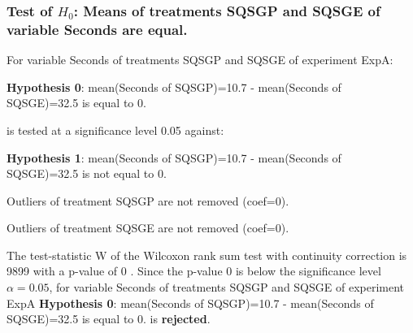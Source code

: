 \begin{frame}[t]
 \frametitle{Test of $H_{0}$: Means of treatments SQSGP and SQSGE of variable Seconds are equal. }
 \scriptsize
 For variable Seconds of treatments SQSGP and SQSGE of experiment ExpA:

\vspace{1mm}
{\bf Hypothesis 0}: mean(Seconds of SQSGP)=10.7 - mean(Seconds of SQSGE)=32.5 is equal to 0.


 \begin{center} is tested at a significance level 0.05 against: \end{center}

{\bf Hypothesis 1}: mean(Seconds of SQSGP)=10.7 - mean(Seconds of SQSGE)=32.5 is not equal to 0.
\vspace{1mm}
\vspace{1mm}

 Outliers of treatment SQSGP  are not removed (coef=0).

 Outliers of treatment SQSGE  are not removed (coef=0).
\vspace{1mm}
 
 The test-statistic W of the Wilcoxon rank sum test with continuity correction is 9899 with a p-value of 0 .
 Since the p-value 0 is below the significance level $\alpha= 0.05 $,
 for variable Seconds of treatments SQSGP and SQSGE of experiment ExpA 
 {\bf Hypothesis 0}: mean(Seconds of SQSGP)=10.7 - mean(Seconds of SQSGE)=32.5 is equal to 0.
is {\bf rejected}.

 \end{frame}
